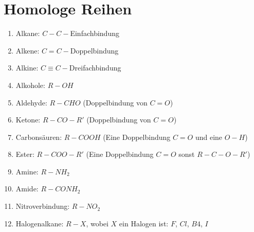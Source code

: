 \section{Homologe Reihen}
\begin{enumerate}
    \item Alkane: $C-C-$Einfachbindung \\

    \item Alkene: $C=C-$Doppelbindung \\
    \item Alkine: $C\equiv C-$Dreifachbindung
    \item Alkohole: $R-OH$
    \item Aldehyde: $R-CHO$ (Doppelbindung von $C=O$)
    \item Ketone: $R-CO-R'$ (Doppelbindung von $C=O$)
    \item Carbonsäuren: $R-COOH$ (Eine Doppelbindung $C=O$ und eine $O-H$)
    \item Ester: $R-COO-R'$ (Eine Doppelbindung $C=O$ sonst $R-C-O-R'$)
    \item Amine: $R-NH_2$
    \item Amide: $R-CONH_2$
    \item Nitroverbindung: $R-NO_2$
    \item Halogenalkane: $R-X$, wobei $X$ ein Halogen ist: $F$, $Cl$, $B4$, $I$
\end{enumerate}

